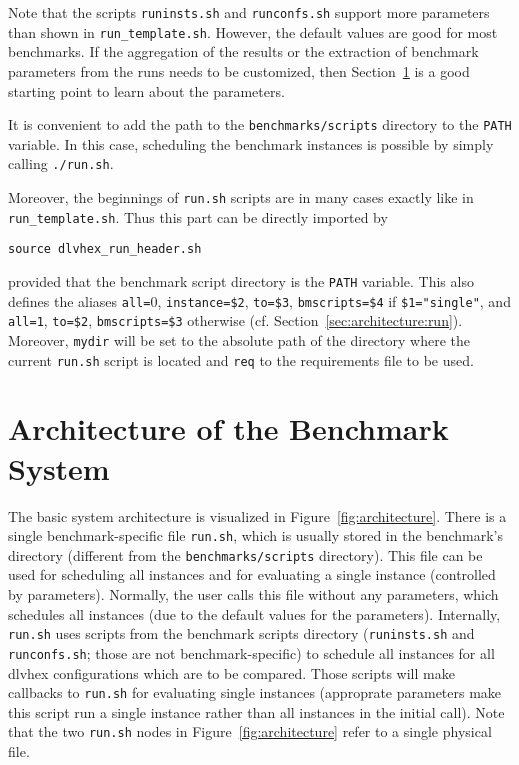 \documentclass[a4paper]{article}
\newcommand{\dlvhex}{{\sc dlvhex}}
\begin{document}
		Note that the scripts {\tt runinsts.sh} and {\tt runconfs.sh} support more
		parameters than shown in {\tt run\_template.sh}.
		However, the default values are good for most benchmarks.
		If the aggregation of the results or
		the extraction of benchmark parameters from the runs needs to be customized,
		then Section~\ref{sec:architecture} is a good starting point to learn about the parameters.
		
		It is convenient to add the path to the {\tt benchmarks/scripts} directory to the {\tt PATH} variable.
		In this case, scheduling the benchmark instances is possible by simply calling {\tt ./run.sh}.
		
		Moreover, the beginnings of {\tt run.sh} scripts are in many cases exactly
		like in {\tt run\_template.sh}. Thus this part can be directly imported by
		\begin{center}
			{\tt source dlvhex\_run\_header.sh}
		\end{center}
		provided that the benchmark script directory is the {\tt PATH} variable.
		This also defines the aliases
		{\tt all=$0$}, {\tt instance=\$2}, {\tt to=\$3}, {\tt bmscripts=\$4}
		if {\tt \$1="single"}, and
		{\tt all=1}, {\tt to=\$2}, {\tt bmscripts=\$3} otherwise (cf. Section~\ref{sec:architecture:run}).
		Moreover, {\tt mydir} will be set to the absolute path of the directory where
		the current {\tt run.sh} script is located and {\tt req} to the requirements file to be used.
			
	\section{Architecture of the Benchmark System}
	\label{sec:architecture}

		The basic system architecture is visualized in Figure~\ref{fig:architecture}.
		There is a single benchmark-specific file {\tt run.sh}, which is usually stored
		in the benchmark's directory (different from the {\tt benchmarks/scripts} directory).
		This file can be used for scheduling all instances and for evaluating a single instance
		(controlled by parameters). Normally, the user calls this file without any parameters,
		which schedules all instances (due to the default values for the parameters).
		Internally, {\tt run.sh} uses scripts from the benchmark scripts directory
		({\tt runinsts.sh} and {\tt runconfs.sh}; those are not benchmark-specific) to schedule all instances for all \dlvhex{} configurations
		which are to be compared. Those scripts will make callbacks to {\tt run.sh} for evaluating single instances
		(approprate parameters make this script run a single instance rather than all instances in the initial call).
		Note that the two {\tt run.sh} nodes in Figure~\ref{fig:architecture} refer
		to a single physical file.
		
\end{document}
